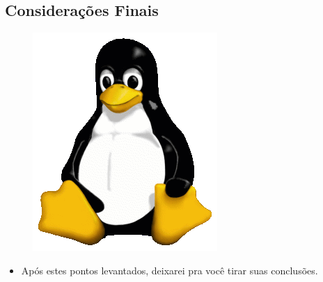 \documentclass{beamer}
\begin{document}
\subsection{Considerações Finais}
\begin{frame} 
\begin{figure}[h!]
        \centering
        \includegraphics[scale=0.3]{Tux.png}
    \end{figure}
\begin{itemize}
\item{Após estes pontos levantados, deixarei pra você tirar suas conclusões.}
    \end{itemize}
\end{frame}
\end{document}
